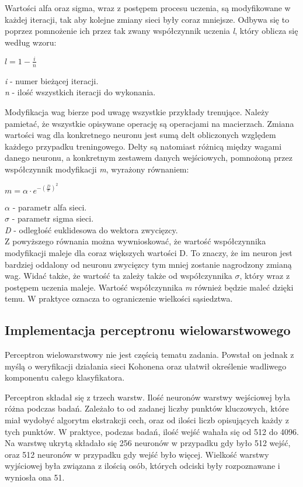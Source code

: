 \documentclass[12pt, notitlepage]{article}
\begin{document}
Wartości alfa oraz sigma, wraz z postępem procesu uczenia, są modyfikowane w każdej iteracji, tak aby kolejne zmiany sieci były coraz mniejsze. Odbywa się to poprzez pomnożenie ich przez tak zwany współczynnik uczenia \textit{l}, który oblicza się według wzoru:
\begin{center}
    $ l = 1 - \frac{i}{n} $ \\
\end{center}
\textit{i} - numer bieżącej iteracji. \\
\textit{n} - ilość wszystkich iteracji do wykonania.

Modyfikacja wag bierze pod uwagę wszystkie przykłady trenujące. Należy pamietać, że wszystkie opisywane operację są operacjami na macierzach. Zmiana wartości wag dla konkretnego neuronu jest sumą delt obliczonych względem każdego przypadku treningowego. Delty są natomiast różnicą między wagami danego neuronu, a konkretnym zestawem danych wejściowych, pomnożoną przez współczynnik modyfikacji \textit{m}, wyrażony równaniem:
\begin{center}
    $ m = \alpha \cdot e^{-(\frac{D}{\sigma})^2} $ \\
\end{center}
$\alpha$ - parametr alfa sieci. \\
$\sigma$ - parametr sigma sieci. \\
\textit{D} - odległość euklidesowa do wektora zwycięzcy. \\
Z powyższego równania można wywnioskować, że wartość współczynnika modyfikacji maleje dla coraz większych wartości D. To znaczy, że im neuron jest bardziej oddalony od neuronu zwycięzcy tym mniej zostanie nagrodzony zmianą wag. Widać także, że wartość ta zależy także od współczynnika $\sigma$, który wraz z postępem uczenia maleje. Wartość współczynnika \textit{m} również będzie maleć dzięki temu. W praktyce oznacza to ograniczenie wielkości sąsiedztwa.

\subsection{Implementacja perceptronu wielowarstwowego}\label{sec:perceptron}

Perceptron wielowarstwowy nie jest częścią tematu zadania. Powstał on jednak z myślą o weryfikacji działania sieci Kohonena oraz ułatwił określenie wadliwego komponentu całego klasyfikatora.

Perceptron składał się z trzech warstw. Ilość neuronów warstwy wejściowej była różna podczas badań. Zależało to od zadanej liczby punktów kluczowych, które miał wydobyć algorytm ekstrakcji cech, oraz od ilości liczb opisujących każdy z tych punktów. W praktyce, podczas badań, ilość wejść wahała się od 512 do 4096. Na warstwę ukrytą składało się 256 neuronów w przypadku gdy było 512 wejść, oraz 512 neuronów w przypadku gdy wejść było więcej. Wielkość warstwy wyjściowej była związana z ilością osób, których odciski były rozpoznawane i wyniosła ona 51.
\end{document}

